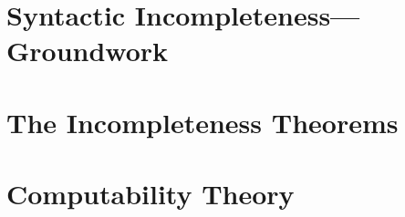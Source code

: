 \documentclass[12pt,oneside]{book}
\theoremstyle{definition}
\begin{document}
\chapter{Syntactic Incompleteness---Groundwork}


\chapter{The Incompleteness Theorems}


\chapter{Computability Theory}

\end{document}
